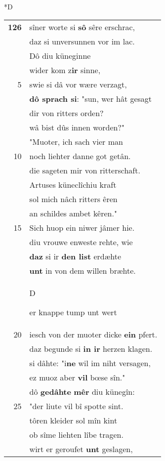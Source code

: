 \documentclass[8pt,a4paper,notitlepage]{article}
\begin{document}
\begin{table}[ht]
\begin{minipage}[t]{0.5\linewidth}
\small
\begin{center}*D
\end{center}
\begin{tabular}{rl}
\textbf{126} & sîner worte si \textbf{sô} sêre erschrac,\\ 
 & daz si unversunnen vor im lac.\\ 
 & Dô diu küneginne\\ 
 & wider kom z\textbf{ir} sinne,\\ 
5 & swie si dâ vor wære verzagt,\\ 
 & \textbf{dô sprach si}: "sun, wer hât gesagt\\ 
 & dir von ritters orden?\\ 
 & wâ bist dûs innen worden?"\\ 
 & "Muoter, ich sach vier man\\ 
10 & noch liehter danne got getân.\\ 
 & die sageten mir von ritterschaft.\\ 
 & Artuses küneclîchiu kraft\\ 
 & sol mich nâch ritters êren\\ 
 & an schildes ambet kêren."\\ 
15 & Sich huop ein niwer jâmer hie.\\ 
 & diu vrouwe enweste rehte, wie\\ 
 & \textbf{daz} si ir \textbf{den list} erdæhte\\ 
 & \textbf{unt} in von dem willen bræhte.\\ 
 & \begin{large}D\end{large}er knappe tump unt wert\\ 
20 & iesch von der muoter dicke \textbf{ein} pfert.\\ 
 & daz begunde si \textbf{in ir} herzen klagen.\\ 
 & si dâhte: "i\textbf{ne} wil im niht versagen,\\ 
 & ez muoz aber \textbf{vil} bœse sîn."\\ 
 & dô \textbf{gedâhte} \textbf{mêr} diu künegîn:\\ 
25 & "der liute vil bî spotte sint.\\ 
 & tôren kleider sol mîn kint\\ 
 & ob sîme liehten lîbe tragen.\\ 
 & wirt er geroufet \textbf{unt} geslagen,\\ 

\end{tabular}
\end{minipage}
\end{table}
\end{document}
